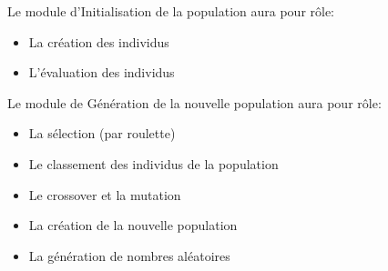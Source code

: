 \documentclass[a4paper,11pt]{article}
\begin{document}
		Le module d’Initialisation de la population aura pour rôle:
		\begin{itemize}
			\item La création des individus
			\item L’évaluation des individus\\
		\end{itemize}
		Le module de Génération de la nouvelle population aura pour rôle:
		\begin{itemize}
			\item La sélection (par roulette)
			\item Le classement des individus de la population
			\item Le crossover et la mutation
			\item La création de la nouvelle population
			\item La génération de nombres aléatoires\\
		\end{itemize}
		

\end{document}
